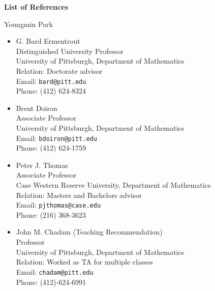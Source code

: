 \documentclass[a4paper,11pt]{article}
\begin{document}
\begin{center}
\Large \textbf{List of References}

\Large Youngmin Park
\end{center}

\begin{itemize}
 \item G. Bard Ermentrout\\
 Distinguished University Professor\\
 University of Pittsburgh, Department of Mathematics\\
 Relation: Doctorate advisor\\
 Email: \texttt{bard@pitt.edu}\\
 Phone: (412) 624-8324
 \item Brent Doiron\\
 Associate Professor\\
 University of Pittsburgh, Department of Mathematics\\
 Email: \texttt{bdoiron@pitt.edu}\\
 Phone: (412) 624-1759
 \item Peter J. Thomas\\
 Associate Professor\\
 Case Western Reserve University, Department of Mathematics\\
 Relation: Masters and Bachelors advisor\\
 Email: \texttt{pjthomas@case.edu}\\
 Phone: (216) 368-3623
 \item John M. Chadam (Teaching Recommendation)\\
 Professor\\
 University of Pittsburgh, Department of Mathematics\\
 Relation: Worked as TA for multiple classes\\
 Email: \texttt{chadam@pitt.edu}\\
 Phone: (412)-624-6991
\end{itemize}
\end{document}
